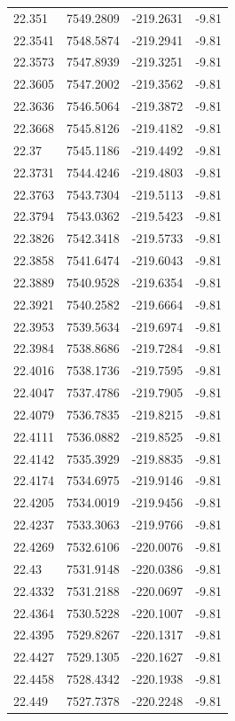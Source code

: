 \begin{table}[H]
\begin{tabular}{llll}
22.351 & 7549.2809 & -219.2631 & -9.81 \\
22.3541 & 7548.5874 & -219.2941 & -9.81 \\
22.3573 & 7547.8939 & -219.3251 & -9.81 \\
22.3605 & 7547.2002 & -219.3562 & -9.81 \\
22.3636 & 7546.5064 & -219.3872 & -9.81 \\
22.3668 & 7545.8126 & -219.4182 & -9.81 \\
22.37 & 7545.1186 & -219.4492 & -9.81 \\
22.3731 & 7544.4246 & -219.4803 & -9.81 \\
22.3763 & 7543.7304 & -219.5113 & -9.81 \\
22.3794 & 7543.0362 & -219.5423 & -9.81 \\
22.3826 & 7542.3418 & -219.5733 & -9.81 \\
22.3858 & 7541.6474 & -219.6043 & -9.81 \\
22.3889 & 7540.9528 & -219.6354 & -9.81 \\
22.3921 & 7540.2582 & -219.6664 & -9.81 \\
22.3953 & 7539.5634 & -219.6974 & -9.81 \\
22.3984 & 7538.8686 & -219.7284 & -9.81 \\
22.4016 & 7538.1736 & -219.7595 & -9.81 \\
22.4047 & 7537.4786 & -219.7905 & -9.81 \\
22.4079 & 7536.7835 & -219.8215 & -9.81 \\
22.4111 & 7536.0882 & -219.8525 & -9.81 \\
22.4142 & 7535.3929 & -219.8835 & -9.81 \\
22.4174 & 7534.6975 & -219.9146 & -9.81 \\
22.4205 & 7534.0019 & -219.9456 & -9.81 \\
22.4237 & 7533.3063 & -219.9766 & -9.81 \\
22.4269 & 7532.6106 & -220.0076 & -9.81 \\
22.43 & 7531.9148 & -220.0386 & -9.81 \\
22.4332 & 7531.2188 & -220.0697 & -9.81 \\
22.4364 & 7530.5228 & -220.1007 & -9.81 \\
22.4395 & 7529.8267 & -220.1317 & -9.81 \\
22.4427 & 7529.1305 & -220.1627 & -9.81 \\
22.4458 & 7528.4342 & -220.1938 & -9.81 \\
22.449 & 7527.7378 & -220.2248 & -9.81 \\

\end{tabular}
\end{table}
